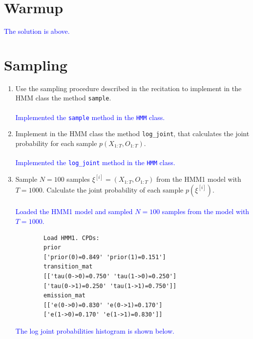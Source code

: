 \documentclass[a4 paper]{article}
\begin{document}



\section{Warmup}

\textcolor{blue}{
    The solution is above. 
}

\section{Sampling}
\begin{enumerate}
    \item Use the sampling procedure described in the recitation to implement in the HMM class the method \texttt{sample}.
    \\ 
    \\
    \textcolor{blue}{
        Implemented the \texttt{sample} method in the \texttt{HMM} class.
    }
    \\

    \item Implement in the HMM class the method \texttt{log\_joint}, that calculates the joint probability for each sample \( p(X_{1:T}, O_{1:T}) \). 
    \\
    \\ \textcolor{blue}{
        Implemented the \texttt{log\_joint} method in the \texttt{HMM} class.
    }
    \\

    \item Sample \( N = 100 \) samples \( \xi^{[i]} = (X_{1:T}, O_{1:T}) \) from the HMM1 model with \( T = 1000 \). Calculate the joint probability of each sample \( p(\xi^{[i]}) \).
    \\
    \\ \textcolor{blue}{
        Loaded the HMM1 model and sampled \( N = 100 \) samples from the model with \( T = 1000 \).
    }
    \begin{verbatim}
        Load HMM1. CPDs:
        prior
        ['prior(0)=0.849' 'prior(1)=0.151']
        transition_mat
        [['tau(0->0)=0.750' 'tau(1->0)=0.250']
        ['tau(0->1)=0.250' 'tau(1->1)=0.750']]
        emission_mat
        [['e(0->0)=0.830' 'e(0->1)=0.170']
        ['e(1->0)=0.170' 'e(1->1)=0.830']]
    \end{verbatim}

    \textcolor{blue}{
        The log joint probabilities histogram is shown below.
    }    
    \\


\end{enumerate}
\end{document}
